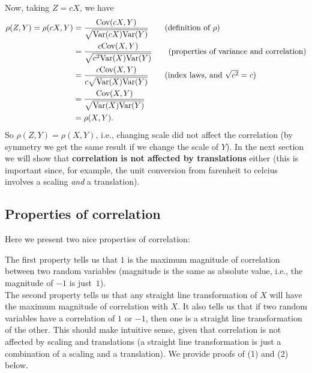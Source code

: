 \noindent Now, taking $Z = cX$, we have
\begin{align*}
\rho(Z,Y) = \rho(cX,Y) & = \frac{\Cov(cX,Y)}{\sqrt{\Var(cX)\Var(Y)}} \tag{definition of $\rho$} \\
& = \frac{c\Cov(X,Y)}{\sqrt{c^2\Var(X)\Var(Y)}} \tag{properties of variance and correlation} \\
& = \frac{c\Cov(X,Y)}{c\sqrt{\Var(X)\Var(Y)}} \tag{index laws, and $\sqrt{c^2} = c$} \\
& = \frac{\Cov(X,Y)}{\sqrt{\Var(X)\Var(Y)}} \\
& = \rho(X,Y).
\end{align*}
So $\rho(Z,Y)  = \rho(X,Y)$, i.e., changing scale did not affect the correlation (by symmetry we get the same result if we change the scale of $Y$). In the next section we will show that \textbf{correlation is not affected by translations} either (this is important since, for example, the unit conversion from farenheit to celcius involves a scaling \textit{and} a translation).

\subsection{Properties of correlation}
Here we present two nice properties of correlation:

  	\bigskip
	
	\hfil{}
	\bigskip

\noindent The first property tells us that $1$ is the maximum magnitude of correlation between two random variables (magnitude is the same as absolute value, i.e., the magnitude of $-1$ is just~$1$). \\

\noindent The second property tells us that any straight line transformation of $X$ will have the maximum magnitude of correlation with $X$. It also tells us that if two random variables have a correlation of $1$ or $-1$, then one is a straight line transformation of the other. This should make intuitive sense, given that correlation is not affected by scaling and translations (a straight line transformation is just a combination of a scaling and a translation). We provide proofs of (1) and (2) below. \\

